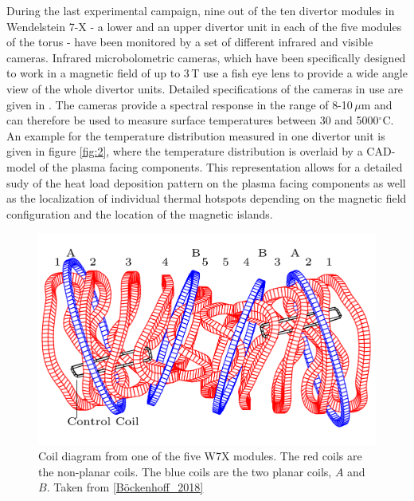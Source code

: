 During the last experimental campaign, nine out of the ten divertor modules in Wendelstein 7-X - a lower and an upper divertor unit in each of the five modules of the torus - have been monitored by a set of different infrared and visible cameras. Infrared microbolometric cameras, which have been specifically designed to work in a magnetic field of up to 3\,T use a fish eye lens to provide a wide angle view of the whole divertor units. Detailed specifications of the cameras in use are given in \cite{Jakubowski2018}. The cameras provide a spectral response in the range of 8-10\,$\mu$m and can therefore be used to measure surface temperatures between 30 and 5000$^\circ$C. An example for the temperature distribution measured in one divertor unit is given in figure \ref{fig:2}, where the temperature distribution is overlaid by a CAD-model of the plasma facing components. This representation allows for a detailed sudy of the heat load deposition pattern on the plasma facing components \cite{Niemann2020} as well as the localization of individual thermal hotspots depending on the magnetic field configuration and the location of the magnetic islands.


\begin{figure}[!htb]
    \centering
    \includegraphics[scale = 0.7]{images/magnetic-coils.png}
    \caption{Coil diagram from one of the five W7X modules. The red coils are the non-planar coils. The blue coils are the two planar coils, $A$ and $B$. Taken from \ref{Böckenhoff_2018}} \label{fig:3}
\end{figure}